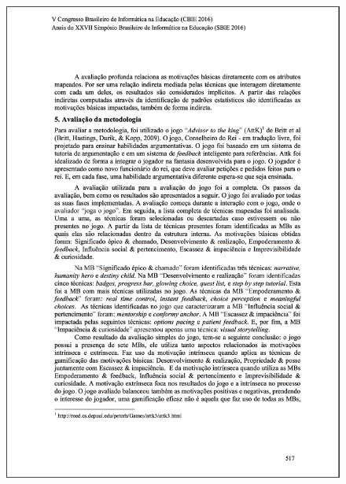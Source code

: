 \begin{apendicesenv}
\begin{figure}[h]
	\centering
		\includegraphics[keepaspectratio=true,scale=0.6]{figuras/a8.png}
\end{figure}


\end{apendicesenv}
